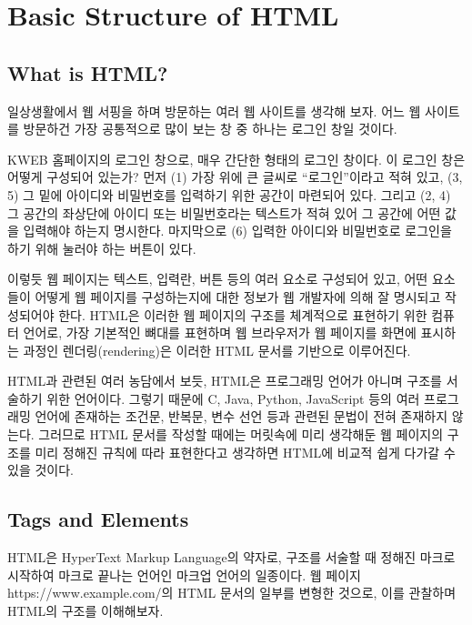 \section{Basic Structure of HTML}\label{sect:html-basic-struct}

\subsection*{What is HTML?}

일상생활에서 웹 서핑을 하며 방문하는 여러 웹 사이트를 생각해 보자. 어느 웹 사이트를 방문하건 가장 공통적으로 많이 보는 창 중 하나는 로그인 창일 것이다.

    {}

\은 KWEB 홈페이지의 로그인 창으로, 매우 간단한 형태의 로그인 창이다. 이 로그인 창은 어떻게 구성되어 있는가? 먼저 (1) 가장 위에 큰 글씨로 ``로그인''이라고 적혀 있고, (3, 5) 그 밑에 아이디와 비밀번호를 입력하기 위한 공간이 마련되어 있다. 그리고 (2, 4) 그 공간의 좌상단에 아이디 또는 비밀번호라는 텍스트가 적혀 있어 그 공간에 어떤 값을 입력해야 하는지 명시한다. 마지막으로 (6) 입력한 아이디와 비밀번호로 로그인을 하기 위해 눌러야 하는 버튼이 있다.

이렇듯 웹 페이지는 텍스트, 입력란, 버튼 등의 여러 요소로 구성되어 있고, 어떤 요소들이 어떻게 웹 페이지를 구성하는지에 대한 정보가 웹 개발자에 의해 잘 명시되고 작성되어야 한다. HTML은 이러한 웹 페이지의 구조를 체계적으로 표현하기 위한 컴퓨터 언어로, 가장 기본적인 뼈대를 표현하며 웹 브라우저가 웹 페이지를 화면에 표시하는 과정인 렌더링(rendering)은 이러한 HTML 문서를 기반으로 이루어진다.

HTML과 관련된 여러 농담에서 보듯, HTML은 프로그래밍 언어가 아니며 구조를 서술하기 위한 언어이다. 그렇기 때문에 C, Java, Python, JavaScript 등의 여러 프로그래밍 언어에 존재하는 조건문, 반복문, 변수 선언 등과 관련된 문법이 전혀 존재하지 않는다. 그러므로 HTML 문서를 작성할 때에는 머릿속에 미리 생각해둔 웹 페이지의 구조를 미리 정해진 규칙에 따라 표현한다고 생각하면 HTML에 비교적 쉽게 다가갈 수 있을 것이다.

\subsection*{Tags and Elements}
HTML은 HyperText Markup Language의 약자로, 구조를 서술할 때 정해진 마크로 시작하여 마크로 끝나는 언어인 마크업 언어의 일종이다. \은 웹 페이지 https://www.example.com/의 HTML 문서의 일부를 변형한 것으로, 이를 관찰하며 HTML의 구조를 이해해보자.


